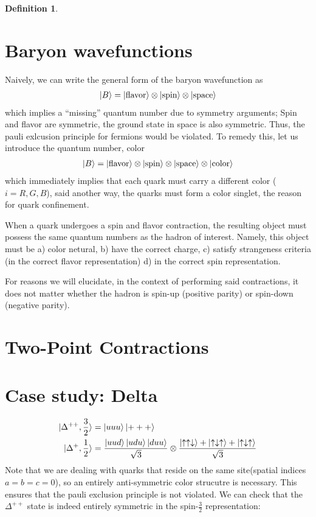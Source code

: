 \documentclass[prd,12pt,superscriptaddress,tightenlines,nofootinbib]{revtex4}
\theoremstyle{plain}
\theoremstyle{definition}
\newtheorem{defn}[thm]{Definition}
\theoremstyle{remark}
\begin{document}
\begin{defn}
\section{Baryon wavefunctions} \label{III}
Naively, we can write the general form of the baryon wavefunction as
\begin{align}
	\ket{B} = \ket{\text{flavor}} \otimes \ket{\text{spin}} \otimes \ket{\text{space}}
\end{align} which implies a ``missing'' quantum number due to symmetry arguments; Spin and flavor are symmetric, the ground state 
in space is also symmetric. Thus, the pauli exlcusion principle for fermions would be violated. To remedy this, let us introduce 
the quantum number, color
\begin{align}
	\ket{B} = \ket{\text{flavor}} \otimes \ket{\text{spin}} \otimes \ket{\text{space}} \otimes \ket{\text{color}}
\end{align} 
which immediately implies that each quark must carry a different color ($i = R,G,B$), said another way, the quarks must form a color singlet, 
the reason for quark confinement. 

When a quark undergoes a spin and flavor contraction, the resulting object must possess the same quantum numbers 
as the hadron of interest. Namely, this object must be a) color netural, b) have the correct charge, c) satisfy 
strangeness criteria (in the correct flavor representation) d) in the correct spin representation.

For reasons we will elucidate, in the context of performing said contractions, it does not matter whether
the hadron is spin-up (positive parity) or spin-down (negative parity). 

\section{Two-Point Contractions}

\section{Case study: Delta}
\begin{align}
	\ket{\Delta^{++},\frac{3}{2}} &= \ket{uuu}\ket{+ + +} \\
	\ket{\Delta^{+},\frac{1}{2}}  &= \frac{\ket{uud} \ket{udu}  \ket{duu} }{\sqrt{3}} \otimes \frac{\ket{\uparrow\uparrow\downarrow} + \ket{\uparrow\downarrow\uparrow} + \ket{\uparrow\downarrow\uparrow}}{\sqrt{3}}
\end{align}
Note that we are dealing with quarks that reside on the same site(spatial indices $a = b = c = 0$), so an entirely anti-symmetric color strucutre is necessary. This ensures that 
the pauli exclusion principle is not violated. We can check that the $\Delta^{++}$ state is indeed entirely symmetric in the spin-$\frac{3}{2}$
representation: 
\begin{gather}
	

\end{gather}
\end{defn}
\end{document}
